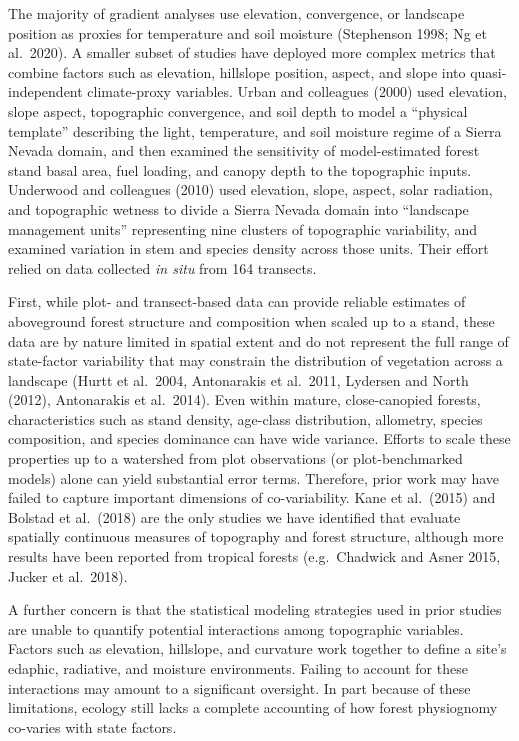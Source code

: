 \documentclass[
  12pt,
]{article}
\begin{document}
The majority of gradient analyses use elevation, convergence, or
landscape position as proxies for temperature and soil moisture
(Stephenson 1998; Ng et al.~2020). A smaller subset of studies have
deployed more complex metrics that combine factors such as elevation,
hillslope position, aspect, and slope into quasi-independent
climate-proxy variables. Urban and colleagues (2000) used elevation,
slope aspect, topographic convergence, and soil depth to model a
``physical template'' describing the light, temperature, and soil
moisture regime of a Sierra Nevada domain, and then examined the
sensitivity of model-estimated forest stand basal area, fuel loading,
and canopy depth to the topographic inputs. Underwood and colleagues
(2010) used elevation, slope, aspect, solar radiation, and topographic
wetness to divide a Sierra Nevada domain into ``landscape management
units'' representing nine clusters of topographic variability, and
examined variation in stem and species density across those units. Their
effort relied on data collected \emph{in situ} from 164 transects.

First, while plot- and transect-based data can provide reliable
estimates of aboveground forest structure and composition when scaled up
to a stand, these data are by nature limited in spatial extent and do
not represent the full range of state-factor variability that may
constrain the distribution of vegetation across a landscape (Hurtt et
al.~2004, Antonarakis et al.~2011, Lydersen and North (2012),
Antonarakis et al.~2014). Even within mature, close-canopied forests,
characteristics such as stand density, age-class distribution,
allometry, species composition, and species dominance can have wide
variance. Efforts to scale these properties up to a watershed from plot
observations (or plot-benchmarked models) alone can yield substantial
error terms. Therefore, prior work may have failed to capture important
dimensions of co-variability. Kane et al.~(2015) and Bolstad et
al.~(2018) are the only studies we have identified that evaluate
spatially continuous measures of topography and forest structure,
although more results have been reported from tropical forests
(e.g.~Chadwick and Asner 2015, Jucker et al.~2018).

A further concern is that the statistical modeling strategies used in
prior studies are unable to quantify potential interactions among
topographic variables. Factors such as elevation, hillslope, and
curvature work together to define a site's edaphic, radiative, and
moisture environments. Failing to account for these interactions may
amount to a significant oversight. In part because of these limitations,
ecology still lacks a complete accounting of how forest physiognomy
co-varies with state factors.
\end{document}
